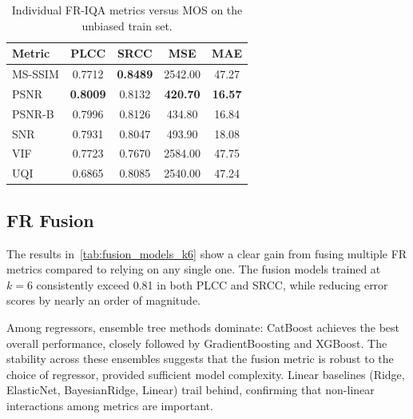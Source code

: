 \begin{table}[htpb]
\centering
\caption{Individual \acs{FR-IQA} metrics versus \acs{MOS} on the unbiased train set.}
\label{tab:fr_individual_metrics}
\begin{tabular}{lcccc}
\hline
\textbf{Metric} & \textbf{\acs{PLCC}} & \textbf{\acs{SRCC}} & \textbf{\acs{MSE}} & \textbf{\acs{MAE}} \\
\hline
\acs{MS-SSIM} & 0.7712 & \textbf{0.8489} & 2542.00 & 47.27 \\
\acs{PSNR}    & \textbf{0.8009} & 0.8132 & \textbf{420.70} & \textbf{16.57} \\
\acs{PSNR-B}  & 0.7996 & 0.8126 & 434.80 & 16.84 \\
\acs{SNR}     & 0.7931 & 0.8047 & 493.90 & 18.08 \\
\acs{VIF}     & 0.7723 & 0.7670 & 2584.00 & 47.75 \\
\acs{UQI}     & 0.6865 & 0.8085 & 2540.00 & 47.24 \\
\hline
\end{tabular}
\end{table}

\subsection{\acl{FR} Fusion}\label{sec:fr-fusion}

The results in~\autoref{tab:fusion_models_k6} show a clear gain from fusing multiple \acs{FR} metrics compared to relying on any single one. The fusion models trained at \(k=6\) consistently exceed 0.81 in both \acs{PLCC} and \acs{SRCC}, while reducing error scores by nearly an order of magnitude.

Among regressors, ensemble tree methods dominate: CatBoost achieves the best overall performance, closely followed by GradientBoosting and XGBoost. The stability across these ensembles suggests that the fusion metric is robust to the choice of regressor, provided sufficient model complexity. Linear baselines (Ridge, ElasticNet, BayesianRidge, Linear) trail behind, confirming that non-linear interactions among metrics are important.


